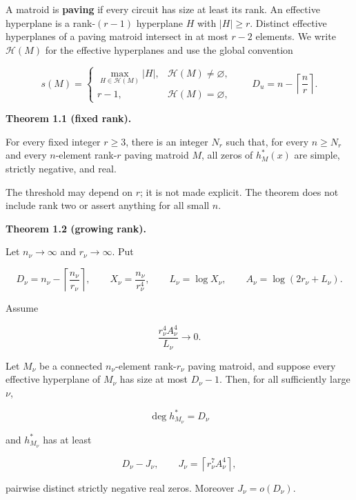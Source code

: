 \documentclass[10pt]{article}
\newenvironment{mdstatement}[1]
  {\par\Needspace{0.16\textheight}\noindent\textbf{#1.}\ \itshape}
  {\par\normalfont}
\begin{document}
A matroid is \textbf{paving} if every circuit has size at least its rank.  An
effective hyperplane is a rank-$(r-1)$ hyperplane $H$ with $|H|\ge r$.
Distinct effective hyperplanes of a paving matroid intersect in at most
$r-2$ elements.
We write $\mathcal H(M)$ for the effective hyperplanes and use the global
convention

\[
 s(M)=\begin{cases}
 \max_{H\in\mathcal H(M)}|H|,&\mathcal H(M)\ne\varnothing,\\
 r-1,&\mathcal H(M)=\varnothing,
 \end{cases}
 \qquad D_u=n-\left\lceil\frac nr\right\rceil. \tag{1.0}
\]

\begin{mdstatement}{Theorem 1.1 (fixed rank)}


For every fixed integer $r\ge3$, there is an integer $N_r$ such that, for
every $n\ge N_r$ and every $n$-element rank-$r$ paving matroid $M$, all
zeros of $h_M^*(x)$ are simple, strictly negative, and real.

\end{mdstatement}

The threshold may depend on $r$; it is not made explicit.  The theorem does
not include rank two or assert anything for all small $n$.

\begin{mdstatement}{Theorem 1.2 (growing rank)}


Let $n_\nu\to\infty$ and $r_\nu\to\infty$.  Put

\[
 D_\nu=n_\nu-\left\lceil\frac{n_\nu}{r_\nu}\right\rceil,
 \qquad X_\nu=\frac{n_\nu}{r_\nu^4},
 \qquad L_\nu=\log X_\nu,
 \qquad A_\nu=\log(2r_\nu+L_\nu).
\]

Assume

\[
 \frac{r_\nu^4A_\nu^4}{L_\nu}\longrightarrow0. \tag{1.1}
\]

Let $M_\nu$ be a connected $n_\nu$-element rank-$r_\nu$ paving matroid,
and suppose every effective hyperplane of $M_\nu$ has size at most
$D_\nu-1$.  Then, for all sufficiently large $\nu$,

\[
 \deg h_{M_\nu}^*=D_\nu
\]

and $h_{M_\nu}^*$ has at least

\[
 D_\nu-J_\nu,
 \qquad J_\nu=\left\lceil r_\nu^7A_\nu^4\right\rceil, \tag{1.2}
\]

pairwise distinct strictly negative real zeros.  Moreover
$J_\nu=o(D_\nu)$.

\end{mdstatement}
\end{document}
